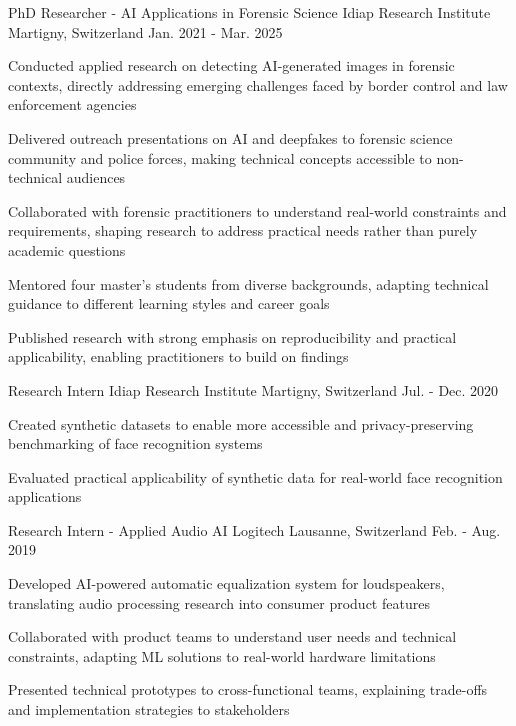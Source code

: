 \begin{cventries}
  \cventry
    {PhD Researcher - AI Applications in Forensic Science} %
    {Idiap Research Institute} %
    {Martigny, Switzerland} %
    {Jan. 2021 - Mar. 2025} %
    {
      \begin{cvitems} %
        \item {Conducted applied research on detecting AI-generated images in forensic contexts, directly addressing emerging challenges faced by border control and law enforcement agencies}
        \item {Delivered outreach presentations on AI and deepfakes to forensic science community and police forces, making technical concepts accessible to non-technical audiences}
        \item {Collaborated with forensic practitioners to understand real-world constraints and requirements, shaping research to address practical needs rather than purely academic questions}
        \item {Mentored four master's students from diverse backgrounds, adapting technical guidance to different learning styles and career goals}
        \item {Published research with strong emphasis on reproducibility and practical applicability, enabling practitioners to build on findings}
      \end{cvitems}
    }

  \cventry
    {Research Intern} %
    {Idiap Research Institute} %
    {Martigny, Switzerland} %
    {Jul. - Dec. 2020} %
    {
      \begin{cvitems} %
        \item {Created synthetic datasets to enable more accessible and privacy-preserving benchmarking of face recognition systems}
        \item {Evaluated practical applicability of synthetic data for real-world face recognition applications}
      \end{cvitems}
    }

  \cventry
    {Research Intern - Applied Audio AI} %
    {Logitech} %
    {Lausanne, Switzerland} %
    {Feb. - Aug. 2019} %
    {
      \begin{cvitems} %
        \item {Developed AI-powered automatic equalization system for loudspeakers, translating audio processing research into consumer product features}
        \item {Collaborated with product teams to understand user needs and technical constraints, adapting ML solutions to real-world hardware limitations}
        \item {Presented technical prototypes to cross-functional teams, explaining trade-offs and implementation strategies to stakeholders}
      \end{cvitems}
    }

\end{cventries}
